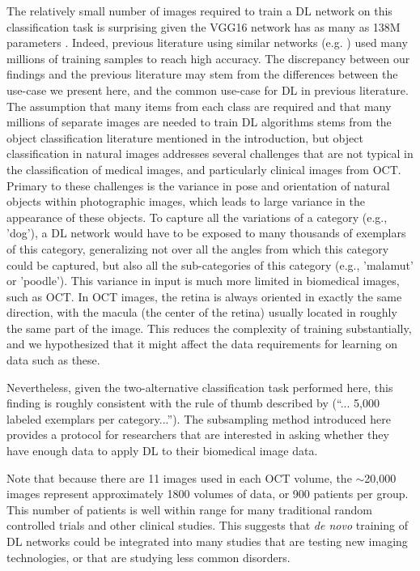 The relatively small number  of images required to train a DL network on this
classification task is surprising given the VGG16 network has as many as 138M
parameters \citep{Canziani2016-ps}. Indeed, previous literature using similar
networks (e.g. \citep{Krizhevsky2012-az, Simonyan2014-al}) used many millions of
training samples to reach high accuracy. The discrepancy between our findings
and the previous literature may stem from the differences between the use-case
we present here, and the common use-case for DL in previous literature. The
assumption that many items from each class are required and that many millions
of separate images are needed to train DL algorithms stems from the object
classification literature mentioned in the introduction, but object
classification in natural images addresses several challenges that are not
typical  in the classification of medical images, and particularly clinical
images from OCT. Primary to these challenges is the variance in pose and
orientation of natural objects within photographic images, which leads to large
variance in the appearance of these objects. To capture all the variations of a
category (e.g., 'dog'), a DL network would have to be exposed to many thousands
of exemplars of this category, generalizing not over all the angles from which
this category could be captured, but also all the sub-categories of this
category (e.g., 'malamut' or 'poodle'). This variance in input is much more
limited in biomedical images, such as OCT. In OCT images, the retina is always
oriented in exactly the same direction, with the macula (the center of the
retina) usually located in roughly the same part of the image. This reduces the
complexity of training substantially, and we hypothesized that it might affect
the data requirements for learning on data such as these.

Nevertheless, given the two-alternative classification task performed here, this
finding is roughly consistent with the rule of thumb described by
\citep{Goodfellow-et-al-2016}(``... 5,000 labeled exemplars per category...'').
The subsampling method introduced here provides a protocol for researchers that
are interested in asking whether they have enough data to apply DL to their
biomedical image data.

Note that because there are 11 images used in each OCT volume, the $\sim$20,000
images represent approximately 1800 volumes of data, or 900 patients per group.
This number of patients is well within range for many traditional random
controlled trials and other clinical studies. This suggests that \emph{de novo}
training of DL networks could be integrated into many studies that are testing
new imaging technologies, or that are studying less common disorders.

